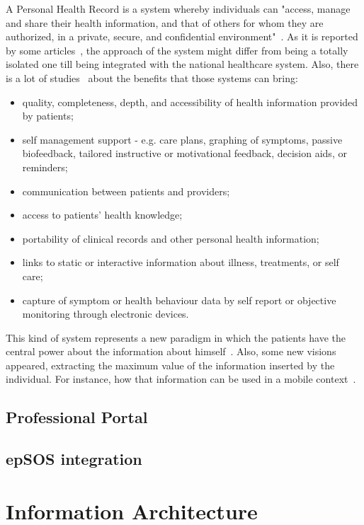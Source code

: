 A Personal Health Record is a system whereby individuals can "access, manage and share their health information, and that of others for whom they are authorized, in a private, secure, and confidential environment"~\citep{Health2003}. As it is reported by some articles~\citep{Tang2006,Tang2009}, the approach of the system might differ from being a totally isolated one till being integrated with the national healthcare system. Also, there is a lot of studies~\cite{Tang2009,Pagliari2007,Detmer2008, Fricton2008} about the benefits that those systems can bring:
\begin{itemize}
\item quality, completeness, depth, and accessibility of health information provided by patients;
\item self management support - e.g. care plans, graphing of symptoms, passive biofeedback, tailored instructive or motivational feedback, decision aids, or reminders;
\item communication between patients and providers;
\item access to patients' health knowledge;
\item portability of clinical records and other personal health information;
\item links to static or interactive information about illness, treatments, or self care;
\item capture of symptom or health behaviour data by self report or objective monitoring through electronic devices.
\end{itemize}

This kind of system represents a new paradigm in which the patients have the central power about the information about himself~\citep{Ball2007}. Also, some new visions appeared, extracting the maximum value of the information inserted by the individual. For instance, how that information can be used in a mobile context~\citep{Brief2010}.


\subsection{Professional Portal}
\subsection{epSOS integration}

\section{Information Architecture}
